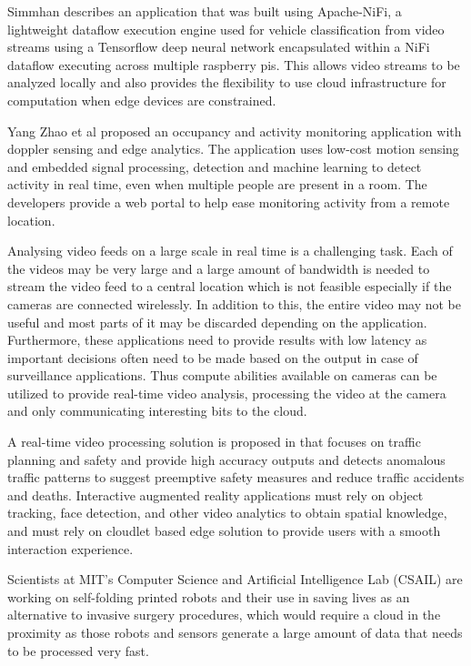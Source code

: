 \documentclass[sigconf]{acmart}
\begin{document}
Simmhan describes an application that was built using Apache-NiFi, a lightweight dataflow execution engine used for vehicle classification from video streams using a Tensorflow deep neural network encapsulated within a NiFi dataflow executing across multiple raspberry pis. This allows video streams to be analyzed locally and also provides the flexibility to use cloud infrastructure for computation when edge devices are constrained\cite{ieee_iot_cloud_analytics_newsletter}.

Yang Zhao et al proposed an occupancy and activity monitoring application with doppler sensing and edge analytics. The application uses low-cost motion sensing and embedded signal processing, detection and machine learning to detect activity in real time, even when multiple people are present in a room. The developers provide a web portal to help ease monitoring activity from a remote location\cite{Dolppler-usecase}.

Analysing video feeds on a large scale in real time is a challenging task. Each of the videos may be very large and a large amount of bandwidth is needed to stream the video feed to a central location which is not feasible especially if the cameras are connected wirelessly. In addition to this, the entire video may not be useful and most parts of it may be discarded depending on the application. Furthermore, these applications need to provide results with low latency as important decisions often need to be made based on the output in case of surveillance applications\cite{rocket-real-time-video}. Thus compute abilities available on cameras can be utilized to provide real-time video analysis, processing the video at the camera and only communicating interesting bits to the cloud\cite{satyanarayananemergence}.

A real-time video processing solution is proposed in \cite{rocket-real-time-video} that focuses on traffic planning and safety and provide high accuracy outputs and detects anomalous traffic patterns to suggest preemptive safety measures and reduce traffic accidents and deaths.
Interactive augmented reality applications must rely on object tracking, face detection, and other video analytics to obtain spatial knowledge, and must rely on cloudlet based edge solution to provide users with a smooth interaction experience\cite{rocket-real-time-video}.

Scientists at MIT's Computer Science and Artificial Intelligence Lab (CSAIL) are working on self-folding printed robots and their use in saving lives as an alternative to invasive surgery procedures, which would require a cloud in the proximity as those robots and sensors generate a large amount of data that needs to be processed very fast\cite{open_stack_living_on_edge}.
\end{document}

